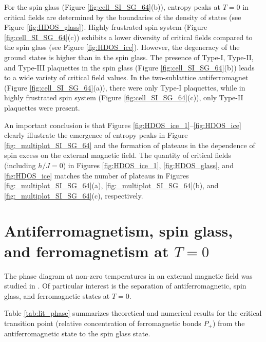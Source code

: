 \documentclass[preprint,12pt]{elsarticle}
\begin{document}
	For the spin glass (Figure \ref{fig:cell_SI_SG_64}(b)), entropy peaks at $T = 0$ in critical fields are determined by the boundaries of the density of states (see Figure \ref{fig:HDOS_glass}).
	Highly frustrated spin system (Figure \ref{fig:cell_SI_SG_64}(c)) exhibits a lower diversity of critical fields compared to the spin glass (see Figure \ref{fig:HDOS_ice}). However, the degeneracy of the ground states is higher than in the spin glass.
	The presence of Type-I, Type-II, and Type-III plaquettes in the spin glass (Figure \ref{fig:cell_SI_SG_64}(b)) leads to a wide variety of critical field values. In the two-sublattice antiferromagnet (Figure \ref{fig:cell_SI_SG_64}(a)), there were only Type-I plaquettes, while in highly frustrated spin system (Figure \ref{fig:cell_SI_SG_64}(c)), only Type-II plaquettes were present.
	
	An important conclusion is that Figures \ref{fig:HDOS_ice_1}--\ref{fig:HDOS_ice} clearly illustrate the emergence of entropy peaks in Figure \ref{fig:_multiplot_SI_SG_64} and the formation of plateaus in the dependence of spin excess on the external magnetic field.  
	The quantity of critical fields (including $h/J=0$) in Figures \ref{fig:HDOS_ice_1}, \ref{fig:HDOS_glass}, and \ref{fig:HDOS_ice} matches the number of plateaus in Figures \ref{fig:_multiplot_SI_SG_64}(a), \ref{fig:_multiplot_SI_SG_64}(b), and \ref{fig:_multiplot_SI_SG_64}(c), respectively.
	
	
	\section{Antiferromagnetism, spin glass, and ferromagnetism at $T = 0$}
	
	The phase diagram at non-zero temperatures in an external magnetic field was studied in \cite{trukhin2024thermodynamic}. Of particular interest is the separation of antiferromagnetic, spin glass, and ferromagnetic states at $T = 0$.
	
	Table \ref{tab:lit_phase} summarizes theoretical and numerical results for the critical transition point (relative concentration of ferromagnetic bonds $P_+$) from the antiferromagnetic state to the spin glass state.
	
\end{document}

